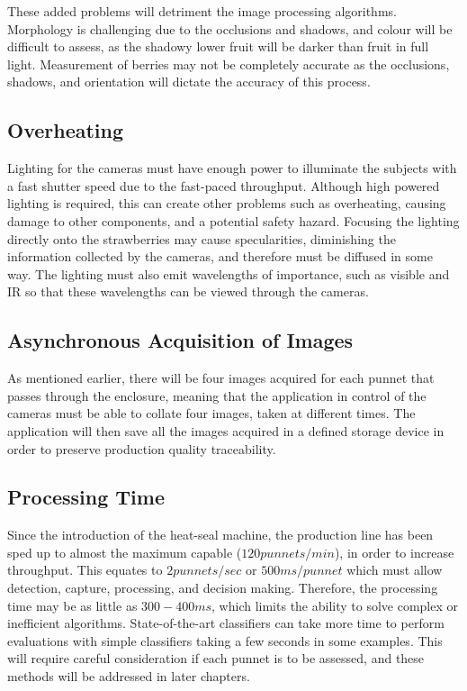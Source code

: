 \documentclass[fleqn,twoside,12pt]{report}
\begin{document}
These added problems will detriment the image processing algorithms. Morphology is challenging due to the occlusions and shadows, and colour will be difficult to assess, as the shadowy lower fruit will be darker than fruit in full light. Measurement of berries may not be completely accurate as the occlusions, shadows, and orientation will dictate the accuracy of this process.



\subsection{Overheating}

Lighting for the cameras must have enough power to illuminate the subjects with a fast shutter speed due to the fast-paced throughput. Although high powered lighting is required, this can create other problems such as overheating, causing damage to other components, and a potential safety hazard. Focusing the lighting directly onto the strawberries may cause specularities, diminishing the information collected by the cameras, and therefore must be diffused in some way. The lighting must also emit wavelengths of importance, such as visible and IR so that these wavelengths can be viewed through the cameras. 

\subsection{Asynchronous Acquisition of Images}

As mentioned earlier, there will be four images acquired for each punnet that passes through the enclosure, meaning that the application in control of the cameras must be able to collate four images, taken at different times. The application will then save all the images acquired in a defined storage device in order to preserve production quality traceability.   

\subsection{Processing Time}

Since the introduction of the heat-seal machine, the production line has been sped up to almost the maximum capable ($120 punnets/min$), in order to increase throughput. This equates to $2 punnets/sec$ or $500ms/ punnet$ which must allow detection, capture, processing, and decision making. Therefore, the processing time may be as little as $300-400ms$, which limits the ability to solve complex or inefficient algorithms. State-of-the-art classifiers can take more time to perform evaluations with simple classifiers taking a few seconds in some examples. This will require careful consideration if each punnet is to be assessed, and these methods will be addressed in later chapters.
\end{document}
